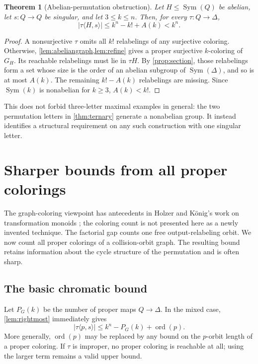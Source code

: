 \documentclass[11pt,a4paper]{article}
\numberwithin{equation}{section}
\newtheorem{theorem}{Theorem}[section]
\theoremstyle{definition}
\theoremstyle{remark}
\newcommand{\D}{\Delta}
\newcommand{\Sym}{\operatorname{Sym}}
\newcommand{\ord}{\operatorname{ord}}
\begin{document}
\begin{theorem}[Abelian-permutation obstruction]\label{thm:abelian}
Let $H\le\Sym(Q)$ be abelian, let $s:Q\to Q$ be singular, and let
$3\le k\le n$. Then, for every $\tau:Q\to\D$,
\[
 |\tau\langle H,s\rangle|\le k^n-k!+A(k)<k^n.
\]
\end{theorem}
\begin{proof}
A nonsurjective $\tau$ omits all $k!$ relabelings of any surjective coloring.
Otherwise, \cref{lem:abeliangraph,lem:refine} gives a proper surjective
$k$-coloring of $G_H$. Its reachable relabelings must lie in $\tau H$.
By \cref{prop:section}, those relabelings form a set whose size is the order
of an abelian subgroup of $\Sym(\D)$, and so is at most $A(k)$. The remaining
$k!-A(k)$ relabelings are missing. Since $\Sym(k)$ is nonabelian for $k\ge3$,
$A(k)<k!$.
\end{proof}

This does not forbid three-letter maximal examples in general: the two
permutation letters in \cref{thm:ternary} generate a nonabelian group. It
instead identifies a structural requirement on any such construction with
one singular letter.

\section{Sharper bounds from all proper colorings}\label{sec:structural}

The graph-coloring viewpoint has antecedents in Holzer and K\"onig's work
on transformation monoids \cite[Sections~4--5]{HolzerKoenig2004}; the
coloring count is not presented here as a newly invented technique.
The factorial gap counts one free output-relabeling orbit. We now count all
proper colorings of a collision-orbit graph. The resulting bound retains
information about the cycle structure of the permutation and is often sharp.

\subsection{The basic chromatic bound}

Let $P_G(k)$ be the number of proper maps $Q\to\D$. In the mixed case,
\cref{lem:rightmost} immediately gives
\begin{equation}\label{eq:chromaticbound}
 |\tau\langle p,s\rangle|
 \le k^n-P_G(k)+\ord(p).
\end{equation}
More generally, $\ord(p)$ may be replaced by any bound on the $p$-orbit
length of a proper coloring. If $\tau$ is improper, no proper coloring is
reachable at all; using the larger term remains a valid upper bound.
\end{document}
